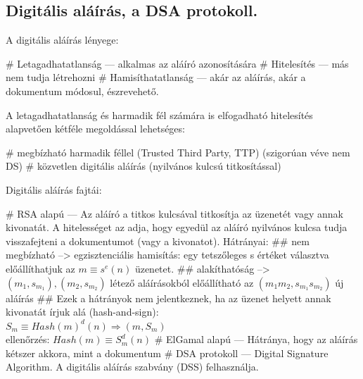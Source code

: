 \subsection{Digitális aláírás, a DSA protokoll.}
A digitális aláírás lényege:
\begin{easylist}[enumerate]
# Letagadhatatlanság --- alkalmas az aláíró azonosítására 
# Hitelesítés --- más nem tudja létrehozni 
# Hamisíthatatlanság --- akár az aláírás, akár a dokumentum módosul, észrevehető.
\end{easylist}
A letagadhatatlanság és harmadik fél számára is elfogadható hitelesítés
alapvetően kétféle megoldással lehetséges:
\begin{easylist}[itemize]
# megbízható harmadik féllel (Trusted Third Party, TTP) (szigorúan véve nem DS)
# közvetlen digitális aláírás (nyilvános kulcsú titkosítással)
\end{easylist}
Digitális aláírás fajtái:
\begin{easylist}[itemize]
# RSA alapú --- Az aláíró a titkos kulcsával titkosítja az üzenetét vagy annak kivonatát. A hitelességet az adja, hogy egyedül az aláíró nyilvános kulcsa tudja visszafejteni a dokumentumot (vagy a kivonatot). Hátrányai:
## nem megbízható --> egzisztenciális hamisítás: egy tetszőleges s értéket választva előállíthatjuk az $ m \equiv s^e (n) $ üzenetet.
## alakíthatóság --> $(m_1,s_{m_1}),(m_2,s_{m_2})$ létező aláírásokból előállítható az $(m_1m_2,s_{m_1}s_{m_2})$ új aláírás
## Ezek a hátrányok nem jelentkeznek, ha az üzenet helyett annak kivonatát írjuk alá (hash-and-sign):\\
$S_m\equiv Hash(m)^d (n) \Rightarrow (m,S_m)$\\
ellenőrzés: $Hash(m) \equiv S_m^d (n)$
# ElGamal alapú --- Hátránya, hogy az aláírás kétszer akkora, mint a dokumentum
# DSA protokoll --- Digital Signature Algorithm. A digitális aláírás szabvány (DSS) felhasználja.
\end{easylist}

